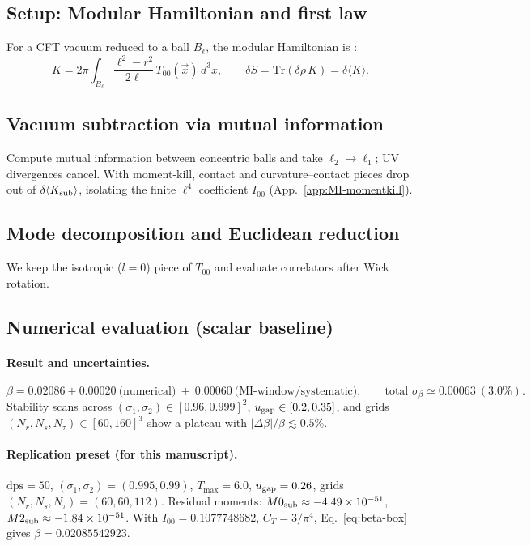 \documentclass[aps,prd,onecolumn,superscriptaddress,nofootinbib]{revtex4-2}
\begin{document}
\subsection{Setup: Modular Hamiltonian and first law}
For a CFT vacuum reduced to a ball $B_\ell$, the modular Hamiltonian is \cite{Casini2011}:
\begin{equation}
K = 2\pi \int_{B_\ell} \frac{\ell^2 - r^2}{2\ell}\, T_{00}(\vec{x})\, d^3x,
\qquad
\delta S = \mathrm{Tr}(\delta\rho\, K) = \delta \langle K \rangle.
\end{equation}

\subsection{Vacuum subtraction via mutual information}
Compute mutual information between concentric balls and take $\ell_2\to\ell_1$; UV divergences cancel. With moment-kill, contact and curvature--contact pieces drop out of $\delta\langle K_{\rm sub}\rangle$, isolating the finite $\ell^4$ coefficient $I_{00}$ (App.~\ref{app:MI-momentkill}).

\subsection{Mode decomposition and Euclidean reduction}
We keep the isotropic ($l=0$) piece of $T_{00}$ and evaluate correlators after Wick rotation.

\subsection{Numerical evaluation (scalar baseline)}
\paragraph*{Result and uncertainties.}
\begin{equation}
\beta = 0.02086 \pm 0.00020\ \text{(numerical)} \ \pm\ 0.00060\ \text{(MI-window/systematic)},\qquad \text{total }\sigma_\beta \simeq 0.00063~(3.0\%).
\end{equation}
Stability scans across $(\sigma_1,\sigma_2)\in[0.96,0.999]^2$, $u_{\rm gap}\in[0.2,0.35]$, and grids $(N_r,N_s,N_\tau)\in[60,160]^3$ show a plateau with $|\Delta\beta|/\beta \lesssim 0.5\%$.

\paragraph*{Replication preset (for this manuscript).}
$\mathrm{dps}=50$, $(\sigma_1,\sigma_2)=(0.995,0.99)$, $T_{\max}=6.0$, $u_{\rm gap}=0.26$, grids $(N_r,N_s,N_\tau)=(60,60,112)$. Residual moments: $M0_{\rm sub}\approx-4.49\times 10^{-51}$, $M2_{\rm sub}\approx-1.84\times 10^{-51}$. With $I_{00}=0.1077748682$, $C_T=3/\pi^4$, Eq.~\eqref{eq:beta-box} gives $\beta=0.02085542923$.
\end{document}
